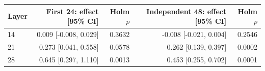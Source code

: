 \begin{tabular}{lrrrr}\toprule
Layer & First 24: effect [95\% CI] & Holm $p$ & Independent 48: effect [95\% CI] & Holm $p$\\\midrule
14 & 0.009 [-0.008, 0.029] & 0.3632 & -0.008 [-0.021, 0.004] & 0.2546\\
21 & 0.273 [0.041, 0.558] & 0.0578 & 0.262 [0.139, 0.397] & 0.0002\\
28 & 0.645 [0.297, 1.110] & 0.0013 & 0.453 [0.255, 0.702] & 0.0001\\
\bottomrule\end{tabular}